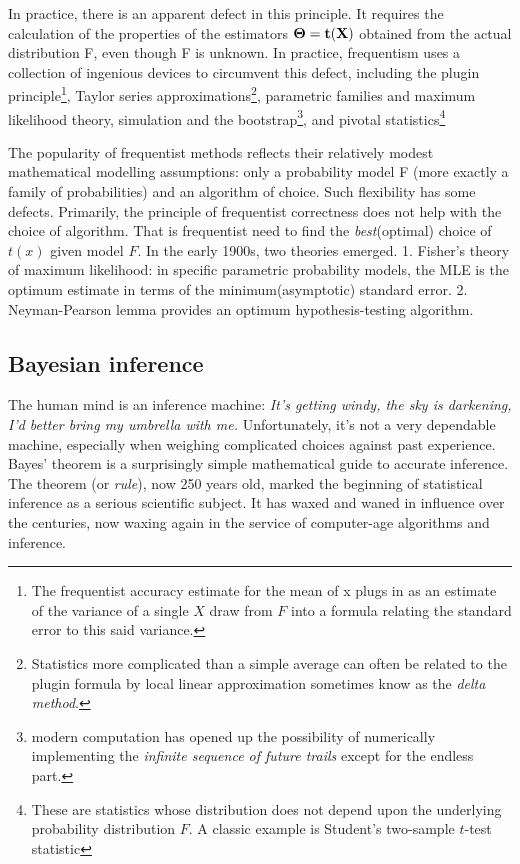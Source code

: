 \documentclass{article}
\begin{document}
In practice, there is an apparent defect in this principle. It requires
the calculation of the properties of the estimators \(\bf{\Theta}=t(X)\)
obtained from the actual distribution F, even though F is unknown. In
practice, frequentism uses a collection of ingenious devices to
circumvent this defect, including the plugin principle\footnote{The
  frequentist accuracy estimate for the mean of x plugs in as an
  estimate of the variance of a single \(X\) draw from \(F\) into a
  formula relating the standard error to this said variance.}, Taylor
series approximations\footnote{ Statistics more complicated than a
  simple average can often be related to the plugin formula by local
  linear approximation sometimes know as the \emph{delta method}.},
parametric families and maximum likelihood theory, simulation and the
bootstrap\footnote{modern computation has opened up the possibility of
  numerically implementing the \emph{infinite sequence of future trails}
  except for the endless part.}, and pivotal statistics\footnote{These
  are statistics whose distribution does not depend upon the underlying
  probability distribution \(F\). A classic example is Student's
  two-sample \(t\)-test statistic}

The popularity of frequentist methods reflects their relatively modest
mathematical modelling assumptions: only a probability model F (more
exactly a family of probabilities) and an algorithm of choice. Such
flexibility has some defects. Primarily, the principle of frequentist
correctness does not help with the choice of algorithm. That is
frequentist need to find the \emph{best}(optimal) choice of \(t(x)\)
given model \(F\). In the early 1900s, two theories emerged. 1. Fisher's
theory of maximum likelihood: in specific parametric probability models,
the MLE is the optimum estimate in terms of the minimum(asymptotic)
standard error. 2. Neyman-Pearson lemma provides an optimum
hypothesis-testing algorithm.

\hypertarget{bayesian-inference}{%
\subsection{Bayesian inference}\label{bayesian-inference}}

The human mind is an inference machine: \emph{It's getting windy, the
sky is darkening, I'd better bring my umbrella with me.} Unfortunately,
it's not a very dependable machine, especially when weighing complicated
choices against past experience. Bayes' theorem is a surprisingly simple
mathematical guide to accurate inference. The theorem (or \emph{rule}),
now 250 years old, marked the beginning of statistical inference as a
serious scientific subject. It has waxed and waned in influence over the
centuries, now waxing again in the service of computer-age algorithms
and inference.
\end{document}
